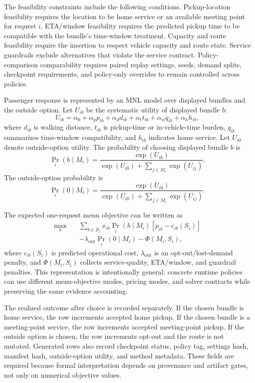 \documentclass[a4paper,fleqn,review]{cas-dc}
\begin{document}
The feasibility constraints include the following conditions. Pickup-location
feasibility requires the location to be home service or an available meeting
point for request $i$. ETA/window feasibility requires the predicted pickup
time to be compatible with the bundle's time-window treatment. Capacity and
route feasibility require the insertion to respect vehicle capacity and route
state. Service guardrails exclude alternatives that violate the service
contract. Policy-comparison comparability requires paired replay settings,
seeds, demand splits, checkpoint requirements, and policy-only overrides to
remain controlled across policies.

Passenger response is represented by an MNL model over displayed bundles and
the outside option. Let $U_{ib}$ be the systematic utility of displayed bundle
$b$:
\begin{equation}
U_{ib}=\alpha_0+\alpha_p p_{ib}+\alpha_d d_{ib}+\alpha_t t_{ib}
       +\alpha_w q_{ib}+\alpha_h h_{ib},
\end{equation}
where $d_{ib}$ is walking distance, $t_{ib}$ is pickup-time or in-vehicle-time
burden, $q_{ib}$ summarizes time-window compatibility, and $h_{ib}$ indicates
home service. Let $U_{i0}$ denote outside-option utility. The probability of
choosing displayed bundle $b$ is
\begin{equation}
\Pr_i(b\mid M_i)=
\frac{\exp(U_{ib})}{\exp(U_{i0})+\sum_{j\in M_i}\exp(U_{ij})}.
\end{equation}
The outside-option probability is
\begin{equation}
\Pr_i(0\mid M_i)=
\frac{\exp(U_{i0})}{\exp(U_{i0})+\sum_{j\in M_i}\exp(U_{ij})}.
\end{equation}

The expected one-request menu objective can be written as
\begin{align}
\max_x\quad
&\sum_{b\in B_i}x_{ib}\Pr_i(b\mid M_i)\left[p_{ib}-c_{ib}(S_i)\right] \nonumber\\
&-\lambda_{\mathrm{out}}\Pr_i(0\mid M_i)-\Phi(M_i,S_i),
\end{align}
where $c_{ib}(S_i)$ is predicted operational cost, $\lambda_{\mathrm{out}}$
is an opt-out/lost-demand penalty, and $\Phi(M_i,S_i)$ collects
service-quality, ETA/window, and guardrail penalties. This representation is
intentionally general: concrete runtime policies can use different
menu-objective modes, pricing modes, and solver contracts while preserving the
same evidence accounting.

The realized outcome after choice is recorded separately. If the chosen bundle
is home service, the row increments accepted home pickup. If the chosen bundle
is a meeting-point service, the row increments accepted meeting-point pickup.
If the outside option is chosen, the row increments opt-out and the route is
not mutated. Generated rows also record checkpoint status, policy tag,
settings hash, manifest hash, outside-option utility, and method metadata.
These fields are required because formal interpretation depends on provenance
and artifact gates, not only on numerical objective values.
\end{document}
